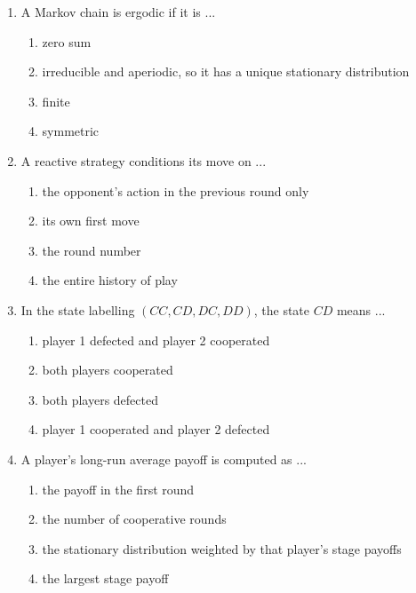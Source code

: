\documentclass[11pt]{article}
\begin{document}
\begin{enumerate}[itemsep=6pt]
  \begin{enumerate}
    \item its values \((1, 0)\) lie on the boundary, so the chain may not be ergodic
    \item it is not a reactive strategy
    \item it always cooperates
    \item it has more than two actions
  \end{enumerate}
  \item A Markov chain is ergodic if it is ...
  \begin{enumerate}
    \item zero sum
    \item irreducible and aperiodic, so it has a unique stationary distribution
    \item finite
    \item symmetric
  \end{enumerate}
  \item A reactive strategy conditions its move on ...
  \begin{enumerate}
    \item the opponent's action in the previous round only
    \item its own first move
    \item the round number
    \item the entire history of play
  \end{enumerate}
  \item In the state labelling \((CC, CD, DC, DD)\), the state \(CD\) means ...
  \begin{enumerate}
    \item player 1 defected and player 2 cooperated
    \item both players cooperated
    \item both players defected
    \item player 1 cooperated and player 2 defected
  \end{enumerate}
  \item A player's long-run average payoff is computed as ...
  \begin{enumerate}
    \item the payoff in the first round
    \item the number of cooperative rounds
    \item the stationary distribution weighted by that player's stage payoffs
    \item the largest stage payoff
  \end{enumerate}

\end{enumerate}
\end{document}
